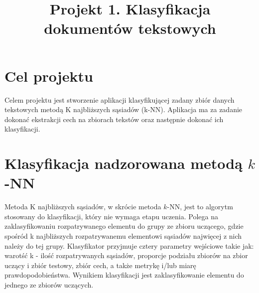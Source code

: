\documentclass{classrep}
\author{
  \studentinfo{Julia Szymańska}{224441} \and
  \studentinfo{Przemysław Zdrzalilllk}{224466} }
\title{Projekt 1. Klasyfikacja dokumentów tekstowych}
\begin{document}
\maketitle


\section{Cel projektu}
Celem projektu jest stworzenie aplikacji klasyfikującej zadany zbiór danych tekstowych metodą K najbliższych sąsiadów (k-NN). Aplikacja ma za zadanie dokonać ekstrakcji cech na zbiorach tekstów\cite{dane} oraz następnie dokonać ich klasyfikacji.\\


\section{Klasyfikacja nadzorowana metodą $k$-NN}


Metoda K najbliższych sąsiadów, w skrócie metoda $k$-NN\cite{dane}, jest to algorytm stosowany do klasyfikacji, który nie wymaga etapu uczenia. 
Polega na zaklasyfikowaniu rozpatrywanego elementu do grupy ze zbioru uczącego, gdzie spośród k najbliższych rozpatrywanemu elementowi sąsiadów najwięcej z nich należy do tej grupy. Klasyfikator przyjmuje cztery parametry wejściowe takie jak: warotść k - ilość rozpatrywanych sąsiadów, proporcje podziału zbiorów na zbior uczący i zbiór testowy, zbiór cech, a także metrykę i/lub miarę prawdopodobieństwa. Wynikiem klasyfikacji jest zaklasyfikowanie elementu do jednego ze zbiorów uczących. 
\end{document}
